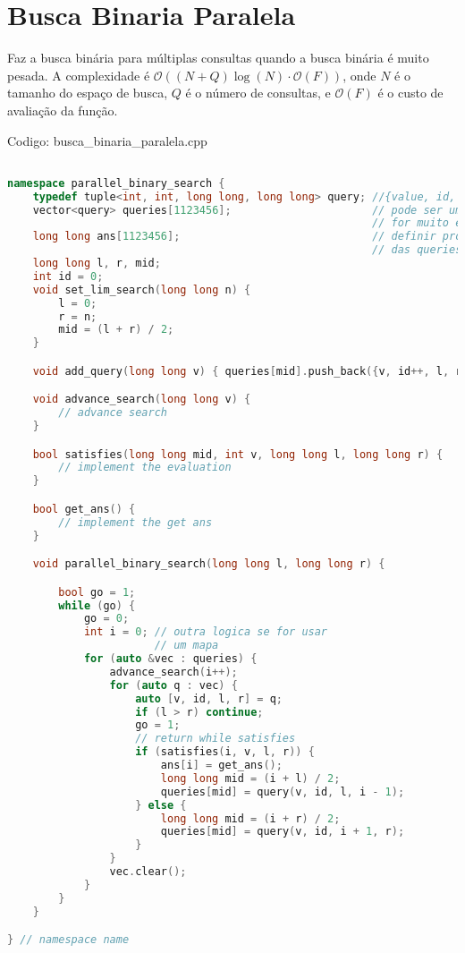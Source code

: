 \documentclass[10pt, a4paper, oneside]{book}
\begin{document}
\section{Busca Binaria Paralela}


Faz a busca binária para múltiplas consultas quando a busca binária é muito pesada. A complexidade é $\mathcal{O}((N+Q) \log(N) \cdot \mathcal{O}(F))$, onde $N$ é o tamanho do espaço de busca, $Q$ é o número de consultas, e $\mathcal{O}(F)$ é o custo de avaliação da função.

\hfill

Codigo: busca\_binaria\_paralela.cpp

\begin{lstlisting}[language=C++]

namespace parallel_binary_search {
    typedef tuple<int, int, long long, long long> query; //{value, id, l, r}
    vector<query> queries[1123456];                      // pode ser um mapa se
                                                         // for muito esparso
    long long ans[1123456];                              // definir pro tamanho
                                                         // das queries
    long long l, r, mid;
    int id = 0;
    void set_lim_search(long long n) {
        l = 0;
        r = n;
        mid = (l + r) / 2;
    }

    void add_query(long long v) { queries[mid].push_back({v, id++, l, r}); }

    void advance_search(long long v) {
        // advance search
    }

    bool satisfies(long long mid, int v, long long l, long long r) {
        // implement the evaluation
    }

    bool get_ans() {
        // implement the get ans
    }

    void parallel_binary_search(long long l, long long r) {

        bool go = 1;
        while (go) {
            go = 0;
            int i = 0; // outra logica se for usar
                       // um mapa
            for (auto &vec : queries) {
                advance_search(i++);
                for (auto q : vec) {
                    auto [v, id, l, r] = q;
                    if (l > r) continue;
                    go = 1;
                    // return while satisfies
                    if (satisfies(i, v, l, r)) {
                        ans[i] = get_ans();
                        long long mid = (i + l) / 2;
                        queries[mid] = query(v, id, l, i - 1);
                    } else {
                        long long mid = (i + r) / 2;
                        queries[mid] = query(v, id, i + 1, r);
                    }
                }
                vec.clear();
            }
        }
    }

} // namespace name
\end{lstlisting}
\hfill
\end{document}
